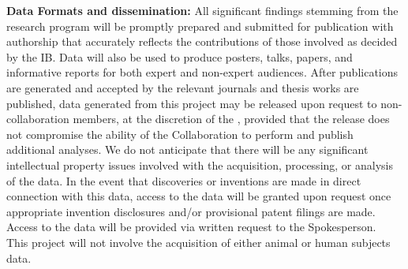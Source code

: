 {\bf Data Formats and dissemination:} All significant findings stemming from the research program will be promptly prepared and submitted for publication with authorship that accurately reflects the contributions of those involved as decided by the IB.  Data will also be used to produce posters, talks, papers, and informative reports for both expert and non-expert audiences.  After publications are generated and accepted by the relevant journals and thesis works are published, data generated from this project may be released upon request to non-collaboration members, at the discretion of the \GADMC, provided that the release does not compromise the ability of the Collaboration to perform and publish additional analyses.  We do not anticipate that there will be any significant intellectual property issues involved with the acquisition, processing, or analysis of the data.  In the event that discoveries or inventions are made in direct connection with this data, access to the data will be granted upon request once appropriate invention disclosures and/or provisional patent filings are made.  Access to the data will be provided via written request to the Spokesperson.   \\

This project will not involve the acquisition of either animal or human subjects data.






